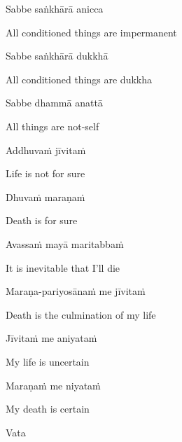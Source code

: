 Sabbe saṅkhārā anicca

\begin{english}
  All conditioned things are impermanent
\end{english}

Sabbe saṅkhārā dukkhā

\begin{english}
  All conditioned things are dukkha
\end{english}

Sabbe dhammā anattā

\begin{english}
  All things are not-self\makeatletter\hyperlink{endnote104-appendix}\makeatother
\end{english}

\suttaRef{[Dhp 277-279]}

Addhuvaṁ jīvitaṁ

\begin{english}
  Life is not for sure
\end{english}

Dhuvaṁ maraṇaṁ

\begin{english}
  Death is for sure
\end{english}

Avassaṁ mayā maritabbaṁ

\begin{english}
  It is inevitable that I'll die
\end{english}

Maraṇa-pariyosānaṁ me jīvitaṁ

\begin{english}
  Death is the culmination of my life
\end{english}

Jīvitaṁ me aniyataṁ

\begin{english}
  My life is uncertain
\end{english}

Maraṇaṁ me niyataṁ

\begin{english}
  My death is certain
\end{english}

\suttaRef{[Dhp A]}

\clearpage

Vata

